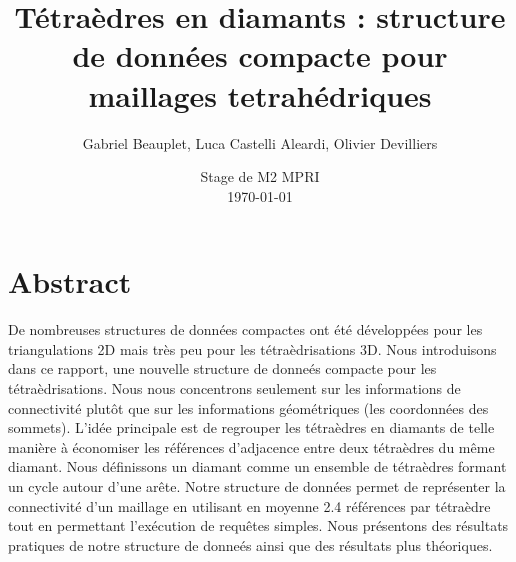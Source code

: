 \documentclass[a4paper,11pt,openany]{article}
\title{Tétraèdres en diamants : structure de données compacte pour maillages tetrahédriques}
\author{Gabriel Beauplet, Luca Castelli Aleardi, Olivier Devilliers}
\date{%
    Stage de M2 MPRI\\%
    \today
}
\begin{document}
\maketitle

\section{Abstract}
\noindent
De nombreuses structures de données compactes ont été développées pour les triangulations 2D mais très peu pour les tétraèdrisations 3D. Nous introduisons dans ce rapport, une nouvelle structure de donneés compacte pour les tétraèdrisations. Nous nous concentrons seulement sur les informations de connectivité plutôt que sur les informations géométriques (les coordonnées des sommets). L'idée principale est de regrouper les tétraèdres en diamants de telle manière à économiser les références d'adjacence entre deux tétraèdres du même diamant. Nous définissons un diamant comme un ensemble de tétraèdres formant un cycle autour d'une arête. Notre structure de données permet de représenter la connectivité d'un maillage en utilisant en moyenne 2.4 références par tétraèdre tout en permettant l'exécution de requêtes simples. Nous présentons des résultats pratiques de notre structure de donneés ainsi que des résultats plus théoriques.
\end{document}

